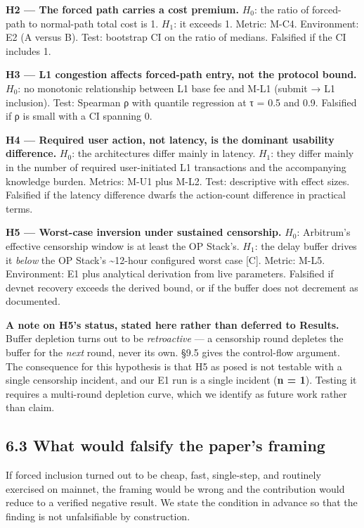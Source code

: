 \documentclass[conference]{IEEEtran}
\renewcommand{\_}{\textunderscore\allowbreak}
\begin{document}
\textbf{H2 --- The forced path carries a cost premium.} \(H_0\): the
ratio of forced-path to normal-path total cost is 1. \(H_1\): it exceeds
1. Metric: M-C4. Environment: E2 (A versus B). Test: bootstrap CI on the
ratio of medians. Falsified if the CI includes 1.

\textbf{H3 --- L1 congestion affects forced-path entry, not the protocol
bound.} \(H_0\): no monotonic relationship between L1 base fee and M-L1
(submit → L1 inclusion). Test: Spearman ρ with quantile regression at τ
= 0.5 and 0.9. Falsified if \textbar ρ\textbar{} is small with a CI
spanning 0.

\textbf{H4 --- Required user action, not latency, is the dominant
usability difference.} \(H_0\): the architectures differ mainly in
latency. \(H_1\): they differ mainly in the number of required
user-initiated L1 transactions and the accompanying knowledge burden.
Metrics: M-U1 plus M-L2. Test: descriptive with effect sizes. Falsified
if the latency difference dwarfs the action-count difference in
practical terms.

\textbf{H5 --- Worst-case inversion under sustained censorship.}
\(H_0\): Arbitrum's effective censorship window is at least the OP
Stack's. \(H_1\): the delay buffer drives it \emph{below} the OP Stack's
\textasciitilde12-hour configured worst case {[}C{]}. Metric: M-L5.
Environment: E1 plus analytical derivation from live parameters.
Falsified if devnet recovery exceeds the derived bound, or if the buffer
does not decrement as documented.

\textbf{A note on H5's status, stated here rather than deferred to
Results.} Buffer depletion turns out to be \emph{retroactive} --- a
censorship round depletes the buffer for the \emph{next} round, never
its own. §9.5 gives the control-flow argument. The consequence for this
hypothesis is that H5 as posed is not testable with a single censorship
incident, and our E1 run is a single incident (\textbf{n = 1}). Testing
it requires a multi-round depletion curve, which we identify as future
work rather than claim.

\subsection{6.3 What would falsify the paper's
framing}\label{what-would-falsify-the-papers-framing}

If forced inclusion turned out to be cheap, fast, single-step, and
routinely exercised on mainnet, the framing would be wrong and the
contribution would reduce to a verified negative result. We state the
condition in advance so that the finding is not unfalsifiable by
construction.
\end{document}
